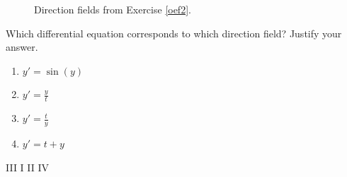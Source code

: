 \begin{Exercise}
\begin{figure}[h!]
{{\label{Fig1c}}
\hfil
{}}
\caption{Direction fields from Exercise \ref{oef2}. \label{figH26}}
\end{figure}

Which differential equation corresponds to which direction field? Justify your answer.

\begin{multicols}{2}
\begin{enumerate}
\item $y' =\sin\left(y\right)$
\item $y'= \displaystyle\frac{y}{t}$
\item $y'= \displaystyle\frac{t}{y}$
\item $y'= t+y$
\end{enumerate}
\end{multicols}
\EndCurrentQuestion
\end{Exercise}

\begin{Answer}
        \begin{multicols}{2}
        \Question III
        \Question I
        \Question II
        \Question IV
        \EndCurrentQuestion
        \end{multicols}
\end{Answer}

